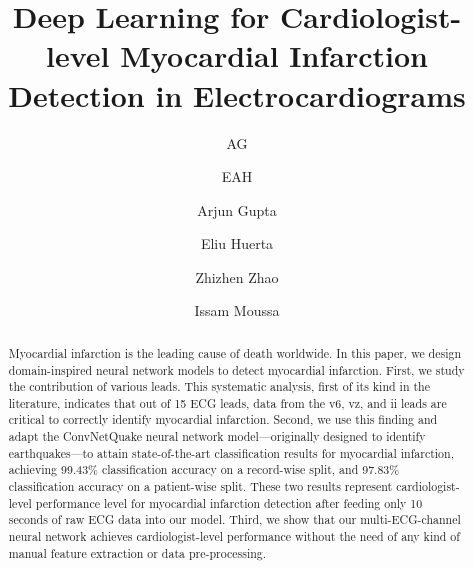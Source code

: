 \documentclass{svproc}
\begin{document}
\mainmatter              \title{Deep Learning for Cardiologist-level Myocardial Infarction Detection in Electrocardiograms}



\author{AG \and EAH }
\author{Arjun Gupta \and Eliu Huerta \and Zhizhen Zhao \and Issam Moussa}
 



\maketitle              

\begin{abstract}
Myocardial infarction is the leading cause of death worldwide. In this paper, we design domain-inspired neural network models to detect myocardial infarction. First, we study the contribution of various leads. This systematic analysis, first of its kind in the literature, indicates that out of 15 ECG leads, data from the v6, vz, and ii leads are critical to correctly identify myocardial infarction. Second, we use this finding and adapt the ConvNetQuake neural network model—originally designed to identify earthquakes—to attain state-of-the-art classification results for myocardial infarction, achieving 99.43\% classification accuracy on a record-wise split, and 97.83\% classification accuracy on a patient-wise split. These two results represent cardiologist-level performance level for myocardial infarction detection after feeding only 10 seconds of raw ECG data into our model. Third, we show that our multi-ECG-channel neural network achieves cardiologist-level performance without the need of any kind of manual feature extraction or data pre-processing.
\end{abstract}
\end{document}

